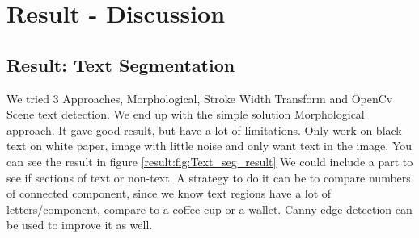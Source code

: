 \documentclass[Report.tex]{subfiles}
\begin{document}
\chapter{Result - Discussion}
\label{chap:Result - Discussion}
\section{Result: Text Segmentation}
We tried 3 Approaches, Morphological, Stroke Width Transform and OpenCv Scene text detection. We end up with the simple solution Morphological approach. It gave good result, but have a lot of limitations. Only work on black text on white paper, image with little noise and only want text in the image. You can see the result in figure \ref{result:fig:Text_seg_result} We could include a part to see if sections of text or non-text. A strategy to do it can be to compare  numbers of connected component, since we know text regions have a lot of letters/component, compare to a coffee cup or a wallet. Canny edge detection can be used to improve it as well. 
\end{document}
